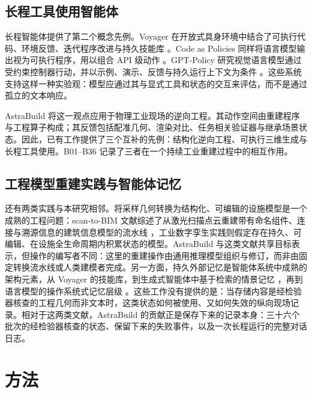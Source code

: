 \documentclass[10pt,a4paper]{article}
\begin{document}
\hypertarget{ux957fux7a0bux5de5ux5177ux4f7fux7528ux667aux80fdux4f53}{%
\subsection{长程工具使用智能体}\label{ux957fux7a0bux5de5ux5177ux4f7fux7528ux667aux80fdux4f53}}

长程智能体提供了第二个概念先例。Voyager
在开放式具身环境中结合了可执行代码、环境反馈、迭代程序改进与持久技能库
\citep{wang2023voyager}。Code as Policies
同样将语言模型输出视为可执行程序，用以组合 API 级动作
\citep{liang2023code}。GPT-Policy
研究视觉语言模型通过受约束控制器行动，并以示例、演示、反馈与持久运行上下文为条件
\citep{cheng2026gptpolicy}。这些系统支持这样一种实验观：模型应通过其与显式工具和状态的交互来评估，而不是通过孤立的文本响应。

AstraBuild
将这一观点应用于物理工业现场的逆向工程。其动作空间由重建程序与工程算子构成；其反馈包括配准几何、渲染对比、任务相关验证器与继承场景状态。因此，已有工作提供了三个互补的先例：结构化逆向工程、可执行三维生成与长程工具使用。B01--B36
记录了三者在一个持续工业重建过程中的相互作用。

\hypertarget{ux5de5ux7a0bux6a21ux578bux91cdux5efaux5b9eux8df5ux4e0eux667aux80fdux4f53ux8bb0ux5fc6}{%
\subsection{工程模型重建实践与智能体记忆}\label{ux5de5ux7a0bux6a21ux578bux91cdux5efaux5b9eux8df5ux4e0eux667aux80fdux4f53ux8bb0ux5fc6}}

还有两类实践与本研究相邻。将采样几何转换为结构化、可编辑的设施模型是一个成熟的工程问题：scan-to-BIM
文献综述了从激光扫描点云重建带有命名组件、连接与溯源信息的建筑信息模型的流水线
\citep{tang2010scanbim}，工业数字孪生实践则假定存在持久、可编辑、在设施全生命周期内积累状态的模型。AstraBuild
与这类文献共享目标表示，但操作的编写者不同：这里的重建操作由通用推理模型组织与修订，而非由固定转换流水线或人类建模者完成。另一方面，持久外部记忆是智能体系统中成熟的架构元素，从
Voyager 的技能库，到生成式智能体中基于检索的情景记忆
\citep{park2023generative}，再到语言模型的操作系统式记忆层级
\citep{packer2023memgpt}。这些工作没有提供的是：当存储内容是经检验器核查的工程几何而非文本时，这类状态如何被使用、又如何失效的纵向现场记录。相对于这两类文献，AstraBuild
的贡献正是保存下来的记录本身：三十六个批次的经检验器核查的状态、保留下来的失败事件，以及一次长程运行的完整对话日志。

\hypertarget{ux65b9ux6cd5}{%
\section{方法}\label{ux65b9ux6cd5}}
\end{document}
